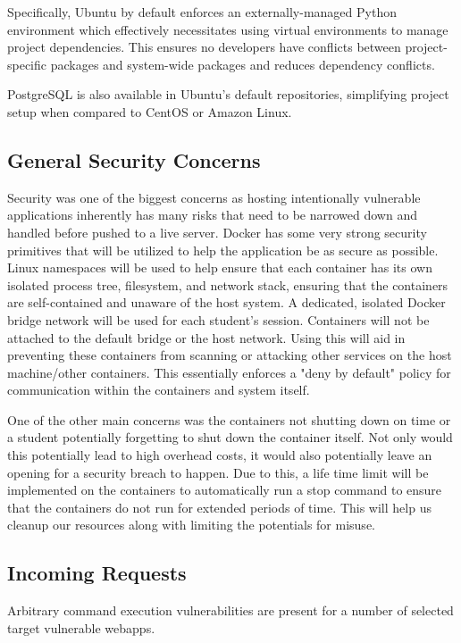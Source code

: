 \documentclass[12pt]{article}
\begin{document}
Specifically, Ubuntu by default enforces an externally-managed Python environment which effectively necessitates using virtual environments to manage project dependencies. This ensures no developers have conflicts between project-specific packages and system-wide packages and reduces dependency conflicts.

PostgreSQL is also available in Ubuntu's default repositories, simplifying project setup when compared to CentOS or Amazon Linux.

\subsection{General Security Concerns}
Security was one of the biggest concerns as hosting intentionally vulnerable applications inherently has many risks that need to be narrowed down and handled before pushed to a live server. Docker has some very strong security primitives that will be utilized to help the application be as secure as possible. Linux namespaces will be used to help ensure that each container has its own isolated process tree, filesystem, and network stack, ensuring that the containers are self-contained and unaware of the host system. A dedicated, isolated Docker bridge network will be used for each student's session. Containers will not be attached to the default bridge or the host network. Using this will aid in preventing these containers from scanning or attacking other services on the host machine/other containers. This essentially enforces a "deny by default" policy for communication within the containers and system itself.

One of the other main concerns was the containers not shutting down on time or a student potentially forgetting to shut down the container itself. Not only would this potentially lead to high overhead costs, it would also potentially leave an opening for a security breach to happen. Due to this, a life time limit will be implemented on the containers to automatically run a stop command to ensure that the containers do not run for extended periods of time. This will help us cleanup our resources along with limiting the potentials for misuse.

\subsection{Incoming Requests}
Arbitrary command execution vulnerabilities are present for a number of selected target vulnerable webapps.
\end{document}
